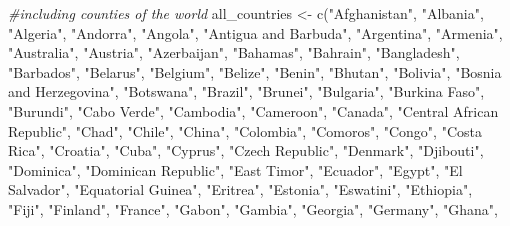 \documentclass[
]{article}
\newenvironment{Shaded}{\begin{snugshade}}{\end{snugshade}}
\newcommand{\CommentTok}[1]{\textcolor[rgb]{0.56,0.35,0.01}{\textit{#1}}}
\newcommand{\FunctionTok}[1]{\textcolor[rgb]{0.00,0.00,0.00}{#1}}
\newcommand{\NormalTok}[1]{#1}
\newcommand{\OtherTok}[1]{\textcolor[rgb]{0.56,0.35,0.01}{#1}}
\newcommand{\StringTok}[1]{\textcolor[rgb]{0.31,0.60,0.02}{#1}}
\begin{document}
\begin{Shaded}
\begin{Highlighting}[]
\CommentTok{\#including counties of the world}
\NormalTok{all\_countries }\OtherTok{\textless{}{-}} \FunctionTok{c}\NormalTok{(}\StringTok{"Afghanistan"}\NormalTok{, }\StringTok{"Albania"}\NormalTok{, }\StringTok{"Algeria"}\NormalTok{, }\StringTok{"Andorra"}\NormalTok{, }\StringTok{"Angola"}\NormalTok{, }\StringTok{"Antigua and Barbuda"}\NormalTok{,}
    \StringTok{"Argentina"}\NormalTok{, }\StringTok{"Armenia"}\NormalTok{, }\StringTok{"Australia"}\NormalTok{, }\StringTok{"Austria"}\NormalTok{, }\StringTok{"Azerbaijan"}\NormalTok{, }\StringTok{"Bahamas"}\NormalTok{, }\StringTok{"Bahrain"}\NormalTok{,}
    \StringTok{"Bangladesh"}\NormalTok{, }\StringTok{"Barbados"}\NormalTok{, }\StringTok{"Belarus"}\NormalTok{, }\StringTok{"Belgium"}\NormalTok{, }\StringTok{"Belize"}\NormalTok{, }\StringTok{"Benin"}\NormalTok{, }\StringTok{"Bhutan"}\NormalTok{,}
    \StringTok{"Bolivia"}\NormalTok{, }\StringTok{"Bosnia and Herzegovina"}\NormalTok{, }\StringTok{"Botswana"}\NormalTok{, }\StringTok{"Brazil"}\NormalTok{, }\StringTok{"Brunei"}\NormalTok{, }\StringTok{"Bulgaria"}\NormalTok{,}
    \StringTok{"Burkina Faso"}\NormalTok{, }\StringTok{"Burundi"}\NormalTok{, }\StringTok{"Cabo Verde"}\NormalTok{, }\StringTok{"Cambodia"}\NormalTok{, }\StringTok{"Cameroon"}\NormalTok{, }\StringTok{"Canada"}\NormalTok{,}
    \StringTok{"Central African Republic"}\NormalTok{, }\StringTok{"Chad"}\NormalTok{, }\StringTok{"Chile"}\NormalTok{, }\StringTok{"China"}\NormalTok{, }\StringTok{"Colombia"}\NormalTok{, }\StringTok{"Comoros"}\NormalTok{,}
    \StringTok{"Congo"}\NormalTok{, }\StringTok{"Costa Rica"}\NormalTok{, }\StringTok{"Croatia"}\NormalTok{, }\StringTok{"Cuba"}\NormalTok{, }\StringTok{"Cyprus"}\NormalTok{, }\StringTok{"Czech Republic"}\NormalTok{, }\StringTok{"Denmark"}\NormalTok{,}
    \StringTok{"Djibouti"}\NormalTok{, }\StringTok{"Dominica"}\NormalTok{, }\StringTok{"Dominican Republic"}\NormalTok{, }\StringTok{"East Timor"}\NormalTok{, }\StringTok{"Ecuador"}\NormalTok{, }\StringTok{"Egypt"}\NormalTok{,}
    \StringTok{"El Salvador"}\NormalTok{, }\StringTok{"Equatorial Guinea"}\NormalTok{, }\StringTok{"Eritrea"}\NormalTok{, }\StringTok{"Estonia"}\NormalTok{, }\StringTok{"Eswatini"}\NormalTok{, }\StringTok{"Ethiopia"}\NormalTok{,}
    \StringTok{"Fiji"}\NormalTok{, }\StringTok{"Finland"}\NormalTok{, }\StringTok{"France"}\NormalTok{, }\StringTok{"Gabon"}\NormalTok{, }\StringTok{"Gambia"}\NormalTok{, }\StringTok{"Georgia"}\NormalTok{, }\StringTok{"Germany"}\NormalTok{, }\StringTok{"Ghana"}\NormalTok{,}

\end{Highlighting}
\end{Shaded}
\end{document}
